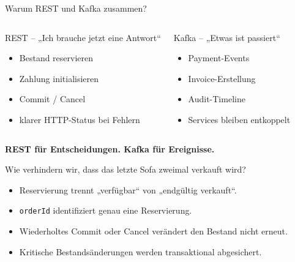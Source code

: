 \documentclass[aspectratio=169,11pt]{beamer}
\newcommand{\storyline}[1]{\vspace{.25cm}\begin{center}\colorbox{hsBlue!8}{\parbox{.92\linewidth}{\centering\small\textbf{#1}}}\end{center}}
\begin{document}
\begin{frame}{Warum REST und Kafka zusammen?}
\begin{columns}[T,onlytextwidth]
\begin{block}{REST – „Ich brauche jetzt eine Antwort“}
\begin{itemize}
  \item Bestand reservieren
  \item Zahlung initialisieren
  \item Commit / Cancel
  \item klarer HTTP-Status bei Fehlern
\end{itemize}
\end{block}
\begin{block}{Kafka – „Etwas ist passiert“}
\begin{itemize}
  \item Payment-Events
  \item Invoice-Erstellung
  \item Audit-Timeline
  \item Services bleiben entkoppelt
\end{itemize}
\end{block}
\end{columns}
\storyline{REST für Entscheidungen. Kafka für Ereignisse.}
\end{frame}

\begin{frame}{Wie verhindern wir, dass das letzte Sofa zweimal verkauft wird?}
\centering
{}

\vspace{.65cm}
\begin{itemize}
  \item Reservierung trennt „verfügbar“ von „endgültig verkauft“.
  \item \texttt{orderId} identifiziert genau eine Reservierung.
  \item Wiederholtes Commit oder Cancel verändert den Bestand nicht erneut.
  \item Kritische Bestandsänderungen werden transaktional abgesichert.
\end{itemize}
\end{frame}
\end{document}
